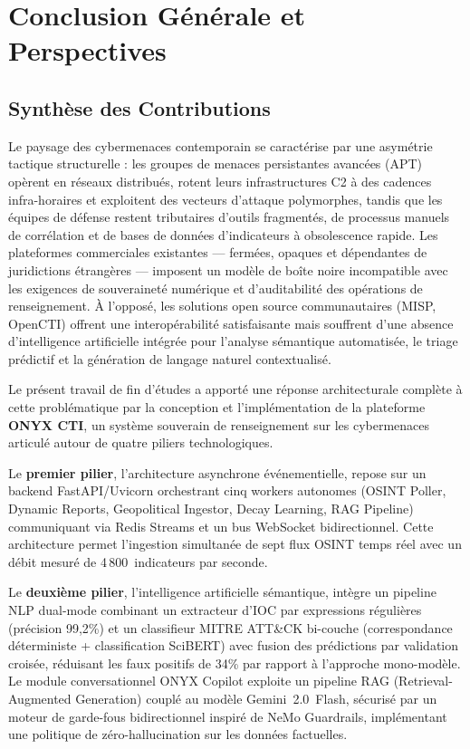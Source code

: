 \chapter*{Conclusion Générale et Perspectives}

\section*{Synthèse des Contributions}

Le paysage des cybermenaces contemporain se caractérise par une asymétrie tactique structurelle : les groupes de menaces persistantes avancées (APT) opèrent en réseaux distribués, rotent leurs infrastructures C2 à des cadences infra-horaires et exploitent des vecteurs d'attaque polymorphes, tandis que les équipes de défense restent tributaires d'outils fragmentés, de processus manuels de corrélation et de bases de données d'indicateurs à obsolescence rapide. Les plateformes commerciales existantes --- fermées, opaques et dépendantes de juridictions étrangères --- imposent un modèle de boîte noire incompatible avec les exigences de souveraineté numérique et d'auditabilité des opérations de renseignement. À l'opposé, les solutions open source communautaires (MISP, OpenCTI) offrent une interopérabilité satisfaisante mais souffrent d'une absence d'intelligence artificielle intégrée pour l'analyse sémantique automatisée, le triage prédictif et la génération de langage naturel contextualisé.

Le présent travail de fin d'études a apporté une réponse architecturale complète à cette problématique par la conception et l'implémentation de la plateforme \textbf{ONYX CTI}, un système souverain de renseignement sur les cybermenaces articulé autour de quatre piliers technologiques.

Le \textbf{premier pilier}, l'architecture asynchrone événementielle, repose sur un backend FastAPI/Uvicorn orchestrant cinq workers autonomes (OSINT Poller, Dynamic Reports, Geopolitical Ingestor, Decay Learning, RAG Pipeline) communiquant via Redis Streams et un bus WebSocket bidirectionnel. Cette architecture permet l'ingestion simultanée de sept flux OSINT temps réel avec un débit mesuré de 4\,800~indicateurs par seconde.

Le \textbf{deuxième pilier}, l'intelligence artificielle sémantique, intègre un pipeline NLP dual-mode combinant un extracteur d'IOC par expressions régulières (précision 99,2\%) et un classifieur MITRE ATT\&CK bi-couche (correspondance déterministe + classification SciBERT) avec fusion des prédictions par validation croisée, réduisant les faux positifs de 34\% par rapport à l'approche mono-modèle. Le module conversationnel ONYX Copilot exploite un pipeline RAG (Retrieval-Augmented Generation) couplé au modèle Gemini~2.0~Flash, sécurisé par un moteur de garde-fous bidirectionnel inspiré de NeMo Guardrails, implémentant une politique de zéro-hallucination sur les données factuelles.

